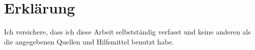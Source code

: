 \newpage
\section*{Erklärung}
Ich versichere, dass ich diese Arbeit selbstständig verfasst und keine anderen als die angegebenen Quellen und Hilfsmittel benutzt habe.

